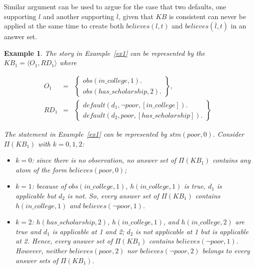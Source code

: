 \documentclass{article}
\newtheorem{example}{Example}%
\begin{document}
Similar argument can be used to argue for the case that two defaults, one supporting $l$ and another supporting $\overline{l}$, given that $KB$ is consistent can never be applied at the same time to create both $believes({l}, t)$ and $believes(\overline{l}, t)$ in an answer set.
\hfill\qedsymbol{}





%
\begin{example} \label{ex2}  
The story in Example~\ref{ex1} 
can be represented by the $KB_1 = \langle  O_1, RD_1 \rangle$ where 

{
\[
\begin{array}{lll}
O_1 & = & \left\{
\begin{array}{l} 
obs(in\_college, 1). \\ 
obs(has\_scholarship, 2).
\end{array}
\right \},   \\
 RD_1 & = & \left\{
\begin{array}{l} 
default(d_1, \neg poor, [in\_college]). \\
default(d_2, poor, [has\_scholarship]).  
\end{array}
\right \} 
\end{array} 
\]
}


The statement in Example~\ref{ex1} can be represented by  $stm(poor, 0).$ 
Consider   $\Pi(KB_1)$ with $k=0,1,2$:  
%
\begin{itemize} 
\item   $k=0$: since there is no observation, no answer set of $\Pi(KB_1)$ contains any atom of the form $believes(poor, 0)$; %
 
\item   $k=1$: because of $obs(in\_college,1)$, $h(in\_college,1)$ is true, 
$d_1$ is applicable but $d_2$ is not.  So, every answer set of $\Pi(KB_1)$ contains    $h(in\_college, 1)$ and $believes(\neg poor, 1)$.  

\item   $k=2$: %
$h(has\_scholarship,2)$, $h(in\_college,1)$, and $h(in\_college,2)$ are true and $d_1$ is applicable at 1 and 2; $d_2$ is not applicable at   1 but is applicable at   2.  Hence, every answer set of $\Pi(KB_1)$ contains $believes(\neg poor, 1)$.  However, 
neither $believes(poor, 2)$ nor $believes(\neg poor, 2)$ belongs to every answer sets of $\Pi(KB_1)$.  


\end{itemize}
\end{example}
\end{document}
